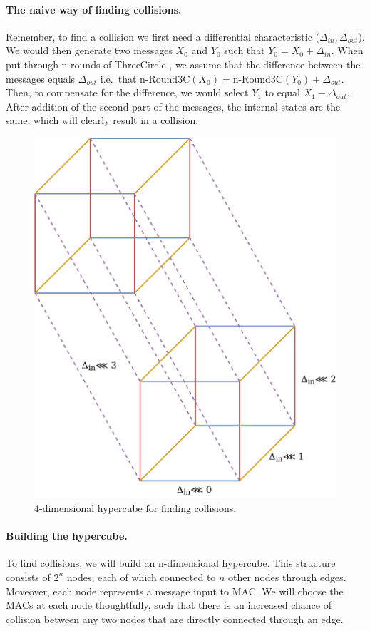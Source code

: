 \documentclass{report}
\newcommand{\ThreeCircle}{{\sc ThreeCircle} }
\begin{document}
\paragraph{The naive way of finding collisions.}
Remember, to find a collision we first need a differential characteristic ($\Delta_{in}, \Delta_{out}$).
We would then generate two messages $X_0$ and $Y_0$ such that $Y_0 = X_0 + \Delta_{in}$. When put through n rounds of \ThreeCircle, we assume that the difference between the messages equals $\Delta_{out}$ i.e.\ that $\text{n-Round3C}(X_0) = \text{n-Round3C}(Y_0) + \Delta_{out}$. Then, to compensate for the difference, we would select $Y_1$ to equal $X_1 - \Delta_{out}$. After addition of the second part of the messages, the internal states are the same, which will clearly result in a collision.

\begin{figure}[ht!]
\centering
\includegraphics[scale=0.1]{imgs/hypercube.png}
\caption{4-dimensional hypercube for finding collisions.}
\label{fig:hypercube}
\end{figure}
\paragraph{Building the hypercube.}
To find collisions, we will build an n-dimensional hypercube. This structure consists of $2^n$ nodes, each of which connected to $n$ other nodes through edges. Moveover, each node represents a message input to MAC. We will choose the MACs at each node thoughtfully, such that there is an increased chance of collision between any two nodes that are directly connected through an edge.
\end{document}
